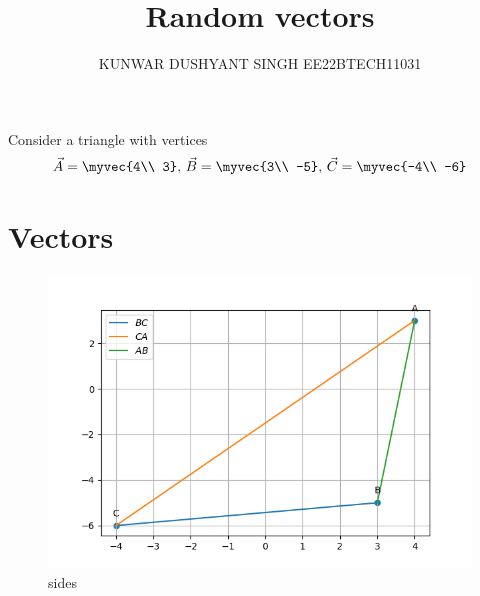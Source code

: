 \documentclass[book,11pt]{IEEEtran}
\begin{document}
\title{
Random vectors
}
\author{ KUNWAR DUSHYANT SINGH EE22BTECH11031}


\maketitle

\newpage
Consider a triangle with vertices
		\begin{align}
			\label{eq:tri-pts}
			\vec{A} = \myvec{4\\ 3},\,
			\vec{B} = \myvec{3\\ -5},\,
			\vec{C} = \myvec{-4\\ -6}
		\end{align}
\section{Vectors}

\begin{figure}[H]
\includegraphics[width=\columnwidth]{figs/main2.png}
\caption{sides}
\label{fig:i_triangle_py}
\end{figure}
\end{document}
